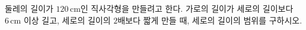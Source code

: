 둘레의 길이가 $120\,\mathrm{cm}$인 직사각형을 만들려고 한다. 가로의 길이가 세로의 길이보다 $6\,\mathrm{cm}$ 이상 길고, 세로의 길이의 $2$배보다 짧게 만들 때, 세로의 길이의 범위를 구하시오.
